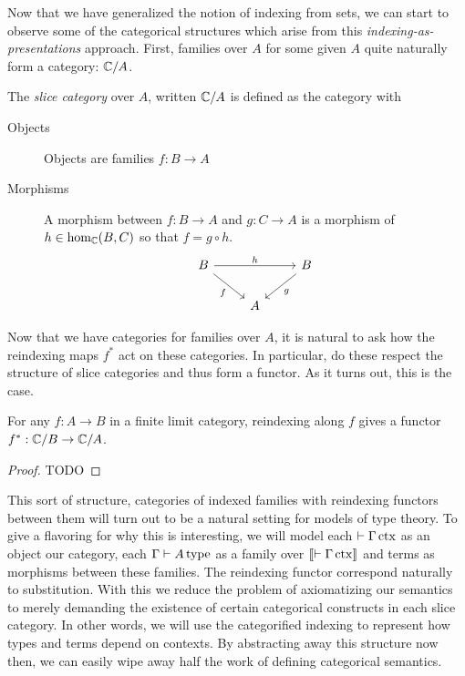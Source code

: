 Now that we have generalized the notion of indexing from sets, we can
start to observe some of the categorical structures which arise from
this \emph{indexing-as-presentations} approach. First, families over
$A$ for some given $A$ quite naturally form a category: $\mathbb{C}/A$.
\begin{defn}\label{defn:fibrations:slicecat}
  The \emph{slice category} over $A$, written $\mathbb{C}/A$ is defined as
  the category with
  \begin{description}
  \item[Objects] Objects are families $f : B \to A$
  \item[Morphisms] A morphism between $f : B \to A$ and $g : C \to A$ is
    a morphism of $h \in \hom_{\mathbb{C}}(B, C)$ so that $f = g \circ h$.
    \[
      \begin{tikzcd}
        B \ar[rr, "h"] \ar[dr, swap, "f"] & & B \ar[dl, "g"]\\
        & A &
      \end{tikzcd}
    \]
  \end{description}
\end{defn}
Now that we have categories for families over $A$, it is natural to
ask how the reindexing maps $f^*$ act on these categories. In
particular, do these respect the structure of slice categories and
thus form a functor. As it turns out, this is the case.
\begin{thm}\label{thm:fibrations:pullbackfunctor}
  For any $f : A \to B$ in a finite limit category, reindexing along
  $f$ gives a functor $f^* : \mathbb{C}/B \to \mathbb{C}/A$.
\end{thm}
\begin{proof}
  TODO
\end{proof}

This sort of structure, categories of indexed families with reindexing
functors between them will turn out to be a natural setting for models
of type theory. To give a flavoring for why this is interesting, we
will model each $\vdash \Gamma\,\mathrm{ctx}$ as an object our category, each
$\Gamma \vdash A\,\mathrm{type}$ as a family over $\llbracket \vdash \Gamma\,\mathrm{ctx} \rrbracket$ and
terms as morphisms between these families. The reindexing functor
correspond naturally to substitution. With this we reduce the problem
of axiomatizing our semantics to merely demanding the existence of
certain categorical constructs in each slice category. In other words,
we will use the categorified indexing to represent how types and terms
depend on contexts. By abstracting away this structure now then, we
can easily wipe away half the work of defining categorical semantics.

